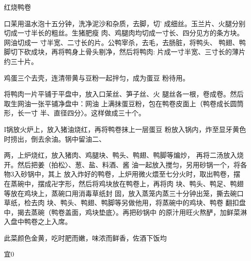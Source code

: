 \begin{recipe}{红烧鸭卷}

\ingredients



\cooking

\step 	口茉用温水泡十五分钟，洗净泥沙和杂质，去脚，切’ 成细丝。玉兰片、火腿分别切成一寸半长的粗丝。生猪肥瘦 肉、鸡腿肉均切成一寸长、四分见方的条方块。网油切成一 寸半宽、二寸长的片。公鸭宰杀，去毛，去肠脏，将鸭头、 鸭翅、鸭脚切下砍成块，再将鸭身上骨头剔净，然后将鸭肉: 片成一寸半宽、三寸长的薄片约三十片。

\step 	鸡蛋三个去壳，连清带黄与豆粉一起拌匀，成为蛋豆 粉待用。

\step 	将鸭肉一片平铺于平盘中，放入口茉丝、笋子丝、火 腿丝各一根，卷成卷。然后取生网油一张平铺净盘中：网油 上满抹蛋豆粉，包在鸭卷皮面上（鸭卷成长圆筒形，长一寸 半、直径四分〉。这样做成三十个。

I锅放火炉上，放入猪油烧红，再将鸭卷抹上一层蛋豆 粉放入锅内，炸至显牙黄色时捞出，倒去余油。锅中留油二、

两，上炉烧红，放入猪肉、鸡腿块、鸭头、鸭翅、鸭脚等煸炒， 再将二汤放入烧开。然后把姜（拍松〉、葱、盐、料酒、酱 油一起放入搅匀，另用砂锅一个，将各物3入砂锅中，其上 放入炸好的鸭卷，上炉用微火煨至七分火时，取出鸭卷，摆 在蒸碗中，摆成卍字形，然后将鸡块放在鸭卷上，再将肉 块、鸭头、鸭足、鸭翅等放在鸡块上，蒸碗口用消毒草纸封 固，放入蒸笼内蒸三十分钟出笼，撕去碗口草纸，检去肉 块、鸭头、鸭翅、鸭脚等另做他用，将蒸碗中的鸡块、鸭卷 翻扣盘中，揭去蒸碗（鸭卷盖面，鸡块垫底〉。再把砂锅中 的原汁用旺火熬酽，加鲜菜淋入盘中鸭卷之上入席。

\notes

此菜颜色金黄，吃时肥而嫩，味浓而鲜香，佐酒下饭均

宜0

\end{recipe}

